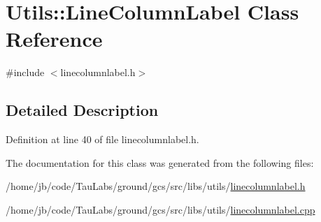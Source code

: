 \hypertarget{class_utils_1_1_line_column_label}{\section{\-Utils\-:\-:\-Line\-Column\-Label \-Class \-Reference}
\label{class_utils_1_1_line_column_label}
}


{\ttfamily \#include $<$linecolumnlabel.\-h$>$}



\subsection{\-Detailed \-Description}


\-Definition at line 40 of file linecolumnlabel.\-h.



\-The documentation for this class was generated from the following files\-:\begin{DoxyCompactItemize}
\item 
/home/jb/code/\-Tau\-Labs/ground/gcs/src/libs/utils/\hyperlink{linecolumnlabel_8h}{linecolumnlabel.\-h}\item 
/home/jb/code/\-Tau\-Labs/ground/gcs/src/libs/utils/\hyperlink{linecolumnlabel_8cpp}{linecolumnlabel.\-cpp}\end{DoxyCompactItemize}
